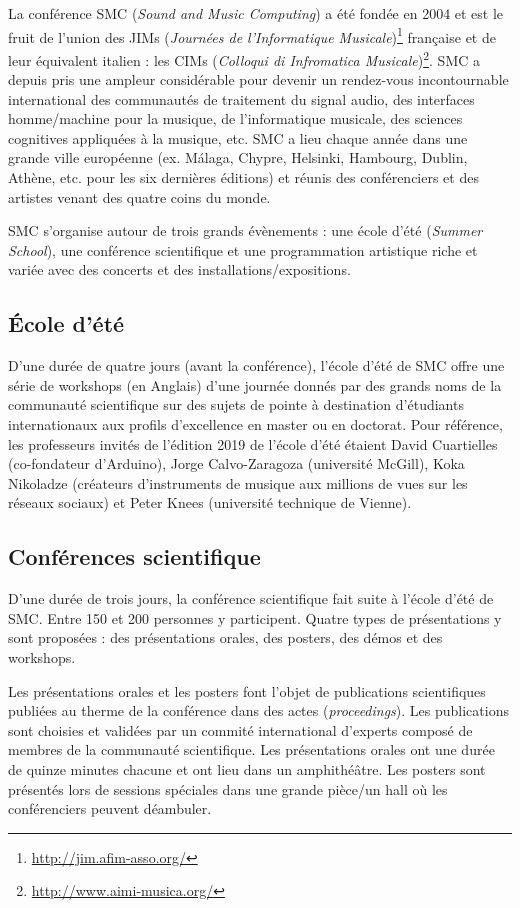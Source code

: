 \documentclass[fontsize=12pt]{scrartcl} %
\numberwithin{equation}{section} %
\numberwithin{figure}{section} %
\numberwithin{table}{section} %
\begin{document}
La conférence SMC (\textit{Sound and Music Computing}) a été fondée en 2004 et est le fruit de l'union des JIMs (\textit{Journées de l'Informatique Musicale})\footnote{\url{http://jim.afim-asso.org/}} française et de leur équivalent italien : les CIMs (\textit{Colloqui di Infromatica Musicale})\footnote{\url{http://www.aimi-musica.org/}}. SMC a depuis pris une ampleur considérable pour devenir un rendez-vous incontournable international des communautés de traitement du signal audio, des interfaces homme/machine pour la musique, de l'informatique musicale, des sciences cognitives appliquées à la musique, etc. SMC a lieu chaque année dans une grande ville européenne (ex. Málaga, Chypre, Helsinki, Hambourg, Dublin, Athène, etc. pour les six dernières éditions) et réunis des conférenciers et des artistes venant des quatre coins du monde.

SMC s'organise autour de trois grands évènements : une école d'été (\textit{Summer School}), une conférence scientifique et une programmation artistique riche et variée avec des concerts et des installations/expositions.

\subsection{École d'été}

D'une durée de quatre jours (avant la conférence), l'école d'été de SMC offre une série de workshops (en Anglais) d'une journée donnés par des grands noms de la communauté scientifique sur des sujets de pointe à destination d'étudiants internationaux aux profils d'excellence en master ou en doctorat. Pour référence, les professeurs invités de l'édition 2019 de l'école d'été étaient David Cuartielles (co-fondateur d'Arduino), Jorge Calvo-Zaragoza (université McGill), Koka Nikoladze (créateurs d'instruments de musique aux millions de vues sur les réseaux sociaux) et Peter Knees (université technique de Vienne). 

\subsection{Conférences scientifique}

D'une durée de trois jours, la conférence scientifique fait suite à l'école d'été de SMC. Entre 150 et 200 personnes y participent. Quatre types de présentations y sont proposées : des présentations orales, des posters, des démos et des workshops. 

Les présentations orales et les posters font l'objet de publications scientifiques publiées au therme de la conférence dans des actes (\textit{proceedings}). Les publications sont choisies et validées par un commité international d'experts composé de membres de la communauté scientifique. Les présentations orales ont une durée de quinze minutes chacune et ont lieu dans un amphithéâtre. Les posters sont présentés lors de sessions spéciales dans une grande pièce/un hall où les conférenciers peuvent déambuler. 
\end{document}
